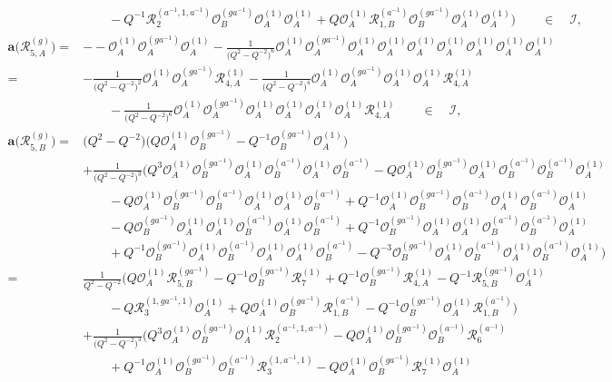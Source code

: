 \documentclass{amsart}
\newcommand{\Oa}{\mathcal O_A}
\newcommand{\Ob}{\mathcal O_B}
\newcommand{\R}{\mathcal R}
\begin{document}
\begin{align*}
&\qquad-Q^{-1}\R_{2}^{(a^{-1},1,a^{-1})}\Ob^{(ga^{-1})}\Oa^{(1)}\Oa^{(1)}+Q\Oa^{(1)}\R_{1,B}^{(a^{-1})}\Ob^{(ga^{-1})}\Oa^{(1)}\Oa^{(1)}\Big)\qquad\in\quad\mathcal I,\\[1em]
\mathbf a\big(\R_{5,A}^{(g)}\big)=&--\Oa^{(1)}\Oa^{(ga^{-1})}\Oa^{(1)}-\frac1{\big(Q^2-Q^{-2}\big)^6}\Oa^{(1)}\Oa^{(ga^{-1})}\Oa^{(1)}\Oa^{(1)}\Oa^{(1)}\Oa^{(1)}\Oa^{(1)}\Oa^{(1)}\Oa^{(1)}\\
=&-\frac1{\big(Q^2-Q^{-2}\big)^2}\Oa^{(1)}\Oa^{(ga^{-1})}\R_{4,A}^{(1)}-\frac1{\big(Q^2-Q^{-2}\big)^4}\Oa^{(1)}\Oa^{(ga^{-1})}\Oa^{(1)}\Oa^{(1)}\R_{4,A}^{(1)}\\
&\qquad-\frac1{\big(Q^2-Q^{-2}\big)^6}\Oa^{(1)}\Oa^{(ga^{-1})}\Oa^{(1)}\Oa^{(1)}\Oa^{(1)}\Oa^{(1)}\R_{4,A}^{(1)}\qquad\in\quad\mathcal I,\\[1em]
\mathbf a\big(\R_{5,B}^{(g)}\big)=&\big(Q^2-Q^{-2}\big)\Big(Q\Oa^{(1)}\Ob^{(ga^{-1})}-Q^{-1}\Ob^{(ga^{-1})}\Oa^{(1)}\Big)\\
&+\frac1{\big(Q^2-Q^{-2}\big)^3}\Big(Q^3\Oa^{(1)}\Ob^{(ga^{-1})}\Oa^{(1)}\Ob^{(a^{-1})}\Oa^{(1)}\Ob^{(a^{-1})}-Q\Oa^{(1)}\Ob^{(ga^{-1})}\Oa^{(1)}\Ob^{(a^{-1})}\Ob^{(a^{-1})}\Oa^{(1)}\\
&\qquad-Q\Oa^{(1)}\Ob^{(ga^{-1})}\Ob^{(a^{-1})}\Oa^{(1)}\Oa^{(1)}\Ob^{(a^{-1})}+Q^{-1}\Oa^{(1)}\Ob^{(ga^{-1})}\Ob^{(a^{-1})}\Oa^{(1)}\Ob^{(a^{-1})}\Oa^{(1)}\\
&\qquad-Q\Ob^{(ga^{-1})}\Oa^{(1)}\Oa^{(1)}\Ob^{(a^{-1})}\Oa^{(1)}\Ob^{(a^{-1})}+Q^{-1}\Ob^{(ga^{-1})}\Oa^{(1)}\Oa^{(1)}\Ob^{(a^{-1})}\Ob^{(a^{-1})}\Oa^{(1)}\\
&\qquad+Q^{-1}\Ob^{(ga^{-1})}\Oa^{(1)}\Ob^{(a^{-1})}\Oa^{(1)}\Oa^{(1)}\Ob^{(a^{-1})}-Q^{-3}\Ob^{(ga^{-1})}\Oa^{(1)}\Ob^{(a^{-1})}\Oa^{(1)}\Ob^{(a^{-1})}\Oa^{(1)}\Big)\\
=&\frac1{Q^2-Q^{-2}}\Big(Q\Oa^{(1)}\R_{5,B}^{(ga^{-1})}-Q^{-1}\Ob^{(ga^{-1})}\R_{7}^{(1)}+Q^{-1}\Ob^{(ga^{-1})}\R_{4,A}^{(1)}-Q^{-1}\R_{5,B}^{(ga^{-1})}\Oa^{(1)}\\
&\qquad-Q\R_{3}^{(1,ga^{-1},1)}\Oa^{(1)}+Q\Oa^{(1)}\Ob^{(ga^{-1})}\R_{1,B}^{(a^{-1})}-Q^{-1}\Ob^{(ga^{-1})}\Oa^{(1)}\R_{1,B}^{(a^{-1})}\Big)\\
&+\frac1{\big(Q^2-Q^{-2}\big)^3}\Big(Q^3\Oa^{(1)}\Ob^{(ga^{-1})}\Oa^{(1)}\R_{2}^{(a^{-1},1,a^{-1})}-Q\Oa^{(1)}\Ob^{(ga^{-1})}\Ob^{(a^{-1})}\R_{6}^{(a^{-1})}\\
&\qquad+Q^{-1}\Oa^{(1)}\Ob^{(ga^{-1})}\Ob^{(a^{-1})}\R_{3}^{(1,a^{-1},1)}-Q\Oa^{(1)}\Ob^{(ga^{-1})}\R_{7}^{(1)}\Oa^{(1)}\\

\end{align*}
\end{document}
